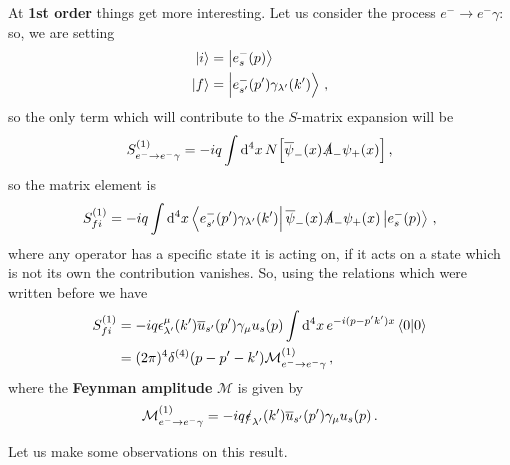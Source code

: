\documentclass[main.tex]{subfiles}
\begin{document}
At \textbf{1st order} things get more interesting. Let us consider the process \(e^{-} \to e^{-} \gamma \): so, we are setting 
%
\begin{align}
\ket{i} &= \ket{e^{-}_{s}(p)}  \\
\ket{f} &= \ket{e^{-}_{s'} (p') \gamma_{\lambda'} (k')}
\,,
\end{align}
%
so the only term which will contribute to the \(S\)-matrix expansion will be 
%
\begin{align}
S^{(1)}_{e^{-} \to e^{-}\gamma } 
= -iq \int \dd[4]{x} N \qty[ \overline{\psi}_{-} (x) \slashed{A}_{-} \psi_{+} (x)]
\,,
\end{align}
%
so the matrix element is 
%
\begin{align}
S^{(1)}_{fi} = -iq \int \dd[4]{x} \bra{e^{-}_{s'} (p') \gamma_{\lambda'} (k')} \overline{\psi}_{-} (x) \slashed{A}_{-} \psi_{+} (x) \ket{e^{-}_{s}(p)}
\,,
\end{align}
%
where any operator has a specific state it is acting on, if it acts on a state which is not its own the contribution vanishes. 
So, using the relations which were written before we have 
%
\begin{align}
S^{(1)}_{fi} &= -iq \epsilon^{\mu }_{\lambda' } (k') \overline{u}_{s'} (p') \gamma_{\mu } u_s (p) \int \dd[4]{x} e^{-i(p - p' k')x} \braket{0}{0}  \\
&= (2 \pi )^{4} \delta^{(4)} (p - p' - k') \mathcal{M}^{(1)}_{e^{-} \to e^{-}\gamma }
\,,
\end{align}
%
where the \textbf{Feynman amplitude} \(\mathcal{M}\) is given by 
%
\begin{align}
\mathcal{M}^{(1)}_{e^{-} \to e^{-}\gamma } =   
-iq \slashed{\epsilon}_{\lambda' } (k') \overline{u}_{s'} (p') \gamma_{\mu } u_s (p)
\,.
\end{align}

Let us make some observations on this result.
\end{document}
